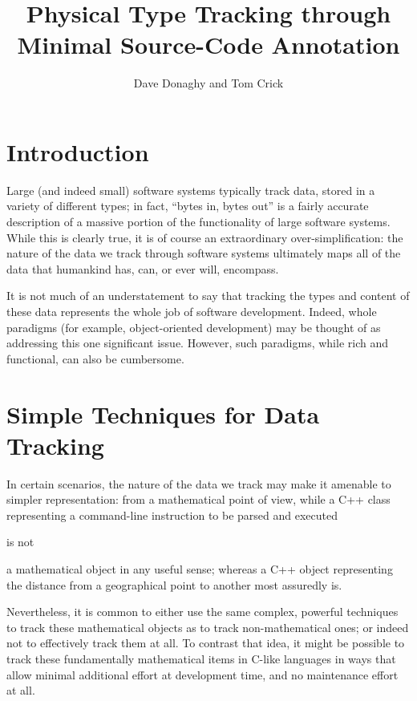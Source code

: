 \documentclass{eceasst}
\title{Physical Type Tracking through Minimal Source-Code Annotation} %
\author{%
Dave Donaghy\autref{1} and
Tom Crick\autref{2}}
\institute{%
\autlabel{1} \email{dave.donaghy@hp.com}\\
HP Bristol, UK\par
\autlabel{2} \email{tcrick@cardiffmet.ac.uk}\\
Department of Computing\\
Cardiff Metropolitan University, UK}
\begin{document}
\maketitle

\section{Introduction}
Large (and indeed small) software systems typically track data, stored
in a variety of different types; in fact, ``bytes in, bytes out'' is a
fairly accurate description of a massive portion of the functionality
of large software systems. While this is clearly true, it is of course
an extraordinary over-simplification: the nature of the data we track
through software systems ultimately maps all of the data that
humankind has, can, or ever will, encompass.

It is not much of an understatement to say that tracking the types and
content of these data represents the whole job of software development.
Indeed, whole paradigms (for example, object-oriented development)
may be thought of as addressing this one significant issue. However,
such paradigms, while rich and functional, can also be cumbersome.

\section{Simple Techniques for Data Tracking}

In certain scenarios, the nature of the data we track may make it amenable
to simpler representation: from a mathematical point of view, while a C++
class representing a command-line instruction to be parsed and executed
\begin{em}is not\end{em} a mathematical object in any useful sense;
whereas a C++ object representing the distance from a geographical point
to another most assuredly is.

Nevertheless, it is common to either use the same complex,
powerful techniques to track these mathematical objects as to track
non-mathematical ones; or indeed not to effectively track them at
all. To contrast that idea, it might be possible to track these fundamentally
mathematical items in C-like languages in ways that allow minimal
additional effort at development time, and no maintenance effort at all.
\end{document}
